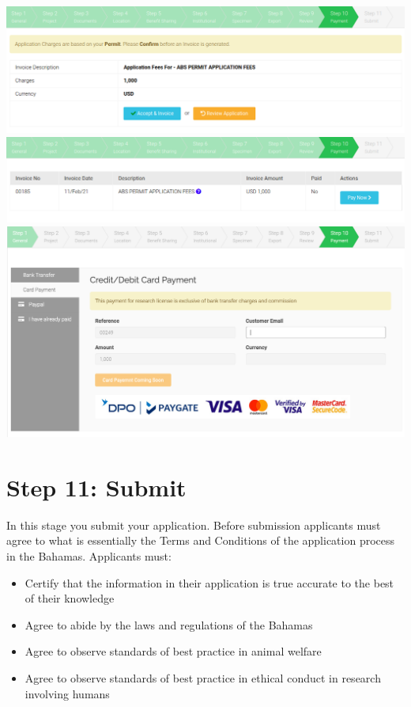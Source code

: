 \documentclass[
]{book}
\providecommand{\tightlist}{%
  \setlength{\itemsep}{0pt}\setlength{\parskip}{0pt}}
\begin{document}
\includegraphics{images/payment1.png}
\includegraphics{images/payment2.png}
\includegraphics{images/payment3.png}

\hypertarget{step-11-submit}{%
\chapter{Step 11: Submit}\label{step-11-submit}}

In this stage you submit your application. Before submission applicants must agree to what is essentially the Terms and Conditions of the application process in the Bahamas. Applicants must:

\begin{itemize}
\tightlist
\item
  Certify that the information in their application is true accurate to the best of their knowledge
\item
  Agree to abide by the laws and regulations of the Bahamas
\item
  Agree to observe standards of best practice in animal welfare
\item
  Agree to observe standards of best practice in ethical conduct in research involving humans
\end{itemize}
\end{document}
